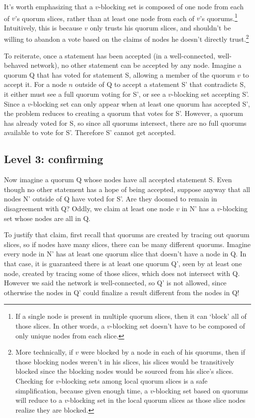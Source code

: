 It's worth emphasizing that a $v$-blocking set is composed of one node from each of $v$'s quorum slices, rather than at least one node from each of $v$'s quorums.\footnote{If a single node is present in multiple quorum slices, then it can `block' all of those slices. In other words, a $v$-blocking set doesn't have to be composed of only unique nodes from each slice.} Intuitively, this is because $v$ only trusts his quorum slices, and shouldn't be willing to abandon a vote based on the claims of nodes he doesn't directly trust.\footnote{More technically, if $v$ were blocked by a node in each of his quorums, then if those blocking nodes weren't in his slices, his slices would be transitively blocked since the blocking nodes would be sourced from his slice's slices. Checking for $v$-blocking sets among local quorum slices is a safe simplification, because given enough time, a $v$-blocking set based on quorums will reduce to a $v$-blocking set in the local quorum slices as those slice nodes realize they are blocked.}

To reiterate, once a statement has been accepted (in a well-connected, well-behaved network), no other statement can be accepted by any node. Imagine a quorum Q that has voted for statement S, allowing a member of the quorum $v$ to accept it. For a node $n$ outside of Q to accept a statement S' that contradicts S, it either must see a full quorum voting for S', or see a $v$-blocking set accepting S'. Since a $v$-blocking set can only appear when at least one quorum has accepted S', the problem reduces to creating a quorum that votes for S'. However, a quorum has already voted for S, so since all quorums intersect, there are no full quorums available to vote for S'. Therefore S' cannot get accepted.

\subsection{Level 3: confirming}
\label{subsec:consensus-lv3-confirming}

Now imagine a quorum Q whose nodes have all accepted statement S. Even though no other statement has a hope of being accepted, suppose anyway that all nodes N' outside of Q have voted for S'. Are they doomed to remain in disagreement with Q? Oddly, we claim at least one node $v$ in N' has a $v$-blocking set whose nodes are all in Q.

To justify that claim, first recall that quorums are created by tracing out quorum slices, so if nodes have many slices, there can be many different quorums. Imagine every node in N' has at least one quorum slice that doesn't have a node in Q. In that case, it is guaranteed there is at least one quorum Q', seen by at least one node, created by tracing some of those slices, which does not intersect with Q. However we said the network is well-connected, so Q' is not allowed, since otherwise the nodes in Q' could finalize a result different from the nodes in Q!

